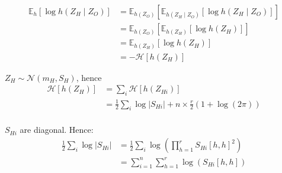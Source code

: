 \documentclass[11pt,a4paper]{article}
\newcommand{\Esp}{\mathds{E}}
\newcommand{\entr}{\mathcal{H}}
\begin{document}
\begin{align*}
\Esp_h[\log h(Z_H\mid Z_O)] &= \Esp_{h(Z_O)}\left[\Esp_{h(Z_H\mid Z_O)}[\log h(Z_H\mid Z_O)]\right]\\
&=\Esp_{h(Z_O)}\left[\Esp_{h(Z_H)}[\log h(Z_H)]\right]\\
&=\Esp_{h(Z_H)}[\log h(Z_H)] \\
&=-\entr[h(Z_H)]
\end{align*}


$Z_H \sim \mathcal{N}(m_H,S_H)$, hence 
\begin{align*}
\entr[h(Z_H)] &= \sum_i \entr[h(Z_{Hi})] \\
&=\frac{1}{2} \sum_i\log |S_{Hi}| +n\times  \frac{r}{2}(1+\log(2\pi))\\
\end{align*}

$S_{Hi}$ are diagonal. Hence:
\begin{align*}
\frac{1}{2} \sum_i\log |S_{Hi}| &= \frac{1}{2} \sum_i \log \left(\prod_{h=1}^r S_{Hi}[h,h]^2 \right)\\
&= \sum_{i=1}^n \sum_{h=1}^r \log(S_{Hi}[h,h])
\end{align*}
\newpage

\end{document}
